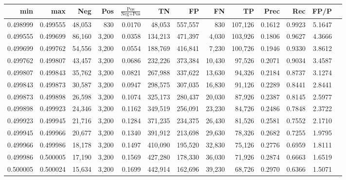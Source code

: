 \begin{tabular}{rrrrrrrrrrrrr}
\toprule
     min &      max &    Neg &   Pos & $\frac{\text{Pos}}{\text{Neg}+\text{Pos}}$ &      TN &      FP &      FN &      TP &   Prec &    Rec &   FP/P \\
\midrule
0.498999 & 0.499555 & 48,053 &   830 &                                     0.0170 &  48,053 & 557,557 &     830 & 107,126 & 0.1612 & 0.9923 & 5.1647 \\
0.499555 & 0.499699 & 86,160 & 3,200 &                                     0.0358 & 134,213 & 471,397 &   4,030 & 103,926 & 0.1806 & 0.9627 & 4.3666 \\
0.499699 & 0.499762 & 54,556 & 3,200 &                                     0.0554 & 188,769 & 416,841 &   7,230 & 100,726 & 0.1946 & 0.9330 & 3.8612 \\
0.499762 & 0.499807 & 43,457 & 3,200 &                                     0.0686 & 232,226 & 373,384 &  10,430 &  97,526 & 0.2071 & 0.9034 & 3.4587 \\
0.499807 & 0.499843 & 35,762 & 3,200 &                                     0.0821 & 267,988 & 337,622 &  13,630 &  94,326 & 0.2184 & 0.8737 & 3.1274 \\
0.499843 & 0.499873 & 30,587 & 3,200 &                                     0.0947 & 298,575 & 307,035 &  16,830 &  91,126 & 0.2289 & 0.8441 & 2.8441 \\
0.499873 & 0.499898 & 26,598 & 3,200 &                                     0.1074 & 325,173 & 280,437 &  20,030 &  87,926 & 0.2387 & 0.8145 & 2.5977 \\
0.499898 & 0.499923 & 24,346 & 3,200 &                                     0.1162 & 349,519 & 256,091 &  23,230 &  84,726 & 0.2486 & 0.7848 & 2.3722 \\
0.499923 & 0.499945 & 21,716 & 3,200 &                                     0.1284 & 371,235 & 234,375 &  26,430 &  81,526 & 0.2581 & 0.7552 & 2.1710 \\
0.499945 & 0.499966 & 20,677 & 3,200 &                                     0.1340 & 391,912 & 213,698 &  29,630 &  78,326 & 0.2682 & 0.7255 & 1.9795 \\
0.499966 & 0.499986 & 18,178 & 3,200 &                                     0.1497 & 410,090 & 195,520 &  32,830 &  75,126 & 0.2776 & 0.6959 & 1.8111 \\
0.499986 & 0.500005 & 17,190 & 3,200 &                                     0.1569 & 427,280 & 178,330 &  36,030 &  71,926 & 0.2874 & 0.6663 & 1.6519 \\
0.500005 & 0.500024 & 15,634 & 3,200 &                                     0.1699 & 442,914 & 162,696 &  39,230 &  68,726 & 0.2970 & 0.6366 & 1.5071 \\

\end{tabular}
